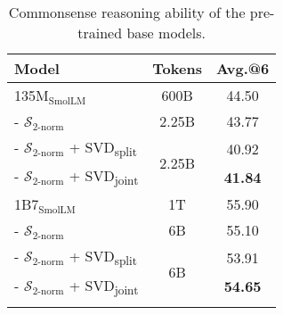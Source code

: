 \begin{table}[t]
\centering
\begin{tabular}{lcc}
  \toprule
  \textbf{Model} & \textbf{Tokens} & \textbf{Avg.@6} \\
  \midrule
  \rowcolor{gray!10}135M$_{\text{SmolLM}}$ & 600B & 44.50 \\
  - $\mathcal{S}_{\text{2-norm}}$ & 2.25B & 43.77 \\
    \arrayrulecolor{gray!20}
  \hline
  - $\mathcal{S}_{\text{2-norm}}$ + SVD\textsubscript{split} & \multirow{2}{*}{2.25B} & 40.92 \\
  - $\mathcal{S}_{\text{2-norm}}$ + SVD\textsubscript{joint} &  & \textbf{41.84}  \\\arrayrulecolor{black}
  \midrule
  \rowcolor{gray!10}1B7$_{\text{SmolLM}}$ & 1T & 55.90 \\
  - $\mathcal{S}_{\text{2-norm}}$ & 6B & 55.10 \\
\arrayrulecolor{gray!20}
\hline
  - $\mathcal{S}_{\text{2-norm}}$ + SVD\textsubscript{split} &  \multirow{2}{*}{6B} & 53.91 \\
  - $\mathcal{S}_{\text{2-norm}}$ + SVD\textsubscript{joint} &  & \textbf{54.65} \\
\arrayrulecolor{black}
  \bottomrule
\end{tabular}
\caption{Commonsense reasoning ability of the pre-trained base models. }
\label{tab:low_rank}
\end{table}